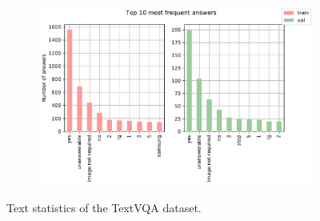 \begin{figure}[h]
  \begin{subfigure}[b]{0.5\textwidth}
    \includegraphics[width=\textwidth]{figures/top10a.pdf}
    \caption{}
    \label{subfig:top10a}
  \end{subfigure}

  \caption{Text statistics of the TextVQA dataset.}
  \label{fig:asdf}
\end{figure}
